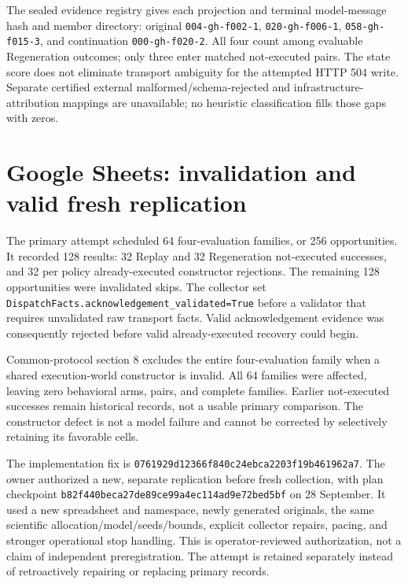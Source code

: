 \documentclass[conference]{IEEEtran}
\newcommand{\codeurl}[1]{{\def\UrlFont{\ttfamily}\nolinkurl{#1}}}
\begin{document}


{\raggedright The sealed evidence registry gives each projection and terminal model-message hash and member directory: original \codeurl{004-gh-f002-1}, \codeurl{020-gh-f006-1}, \codeurl{058-gh-f015-3}, and continuation \codeurl{000-gh-f020-2}. All four count among evaluable Regeneration outcomes; only three enter matched not-executed pairs. The state score does not eliminate transport ambiguity for the attempted HTTP 504 write. Separate certified external malformed/schema-rejected and infrastructure-attribution mappings are unavailable; no heuristic classification fills those gaps with zeros.\par}


\section{Google Sheets: invalidation and valid fresh replication}

{\raggedright The primary attempt scheduled 64 four-evaluation families, or 256 opportunities. It recorded 128 results: 32 Replay and 32 Regeneration not-executed successes, and 32 per policy already-executed constructor rejections. The remaining 128 opportunities were invalidated skips. The collector set \codeurl{DispatchFacts.acknowledgement_validated=True} before a validator that requires unvalidated raw transport facts. Valid acknowledgement evidence was consequently rejected before valid already-executed recovery could begin.\par}


Common-protocol section 8 excludes the entire four-evaluation family when a shared execution-world constructor is invalid. All 64 families were affected, leaving zero behavioral arms, pairs, and complete families. Earlier not-executed successes remain historical records, not a usable primary comparison. The constructor defect is not a model failure and cannot be corrected by selectively retaining its favorable cells.


{\raggedright The implementation fix is \codeurl{0761929d12366f840c24ebca2203f19b461962a7}. The owner authorized a new, separate replication before fresh collection, with plan checkpoint \codeurl{b82f440beca27de89ce99a4ec114ad9e72bed5bf} on 28 September. It used a new spreadsheet and namespace, newly generated originals, the same scientific allocation/model/seeds/bounds, explicit collector repairs, pacing, and stronger operational stop handling. This is operator-reviewed authorization, not a claim of independent preregistration. The attempt is retained separately instead of retroactively repairing or replacing primary records.\par}
\end{document}
